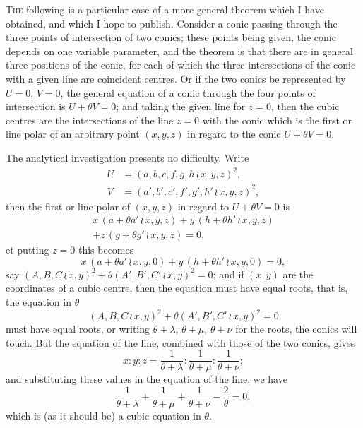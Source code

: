 \documentclass[11pt,a4paper]{book}
\begin{document}
\textsc{The} following is a particular case of a more general theorem which I have obtained, and which I hope to publish. Consider a conic passing through the three points of intersection of two conics; these points being given, the conic depends on one variable parameter, and the theorem is that there are in general three positions of the conic, for each of which the three intersections of the conic with a given line are coincident centres. Or if the two conics be represented by $U=0$, $V=0$, the general equation of a conic through the four points of intersection is $U+\theta V=0$; and taking the given line for $z=0$, then the cubic centres are the intersections of the line $z=0$ with the conic which is the first or line polar of an arbitrary point $(x, y, z)$ in regard to the conic $U+\theta V=0$.

The analytical investigation presents no difficulty. Write
\begin{align*}
U &= (a,b,c,f,g,h\,\wr\,x,y,z)^2, \\
V &= (a',b',c',f',g',h'\,\wr\,x,y,z)^2,
\end{align*}
then the first or line polar of $(x, y, z)$ in regard to $U+\theta V=0$ is
\begin{multline*}
x\,(a+\theta a'\,\wr\,x,y,z) + y\,(h+\theta h'\,\wr\,x,y,z) \\
+ z\,(g+\theta g'\,\wr\,x,y,z) = 0,
\end{multline*}
et putting $z=0$ this becomes
\[
x\,(a+\theta a'\,\wr\,x,y,0) + y\,(h+\theta h'\,\wr\,x,y,0) = 0,
\]
say $(A,B,C\,\wr\,x,y)^2 + \theta(A',B',C'\,\wr\,x,y)^2=0$; and if $(x, y)$ are the coordinates of a cubic centre, then the equation must have equal roots, that is, the equation in $\theta$
\[
(A,B,C\,\wr\,x,y)^2 + \theta(A',B',C'\,\wr\,x,y)^2 = 0
\]
must have equal roots, or writing $\theta + \lambda$, $\theta + \mu$, $\theta + \nu$ for the roots, the conics will touch. But the equation of the line, combined with those of the two conics, gives
\[
x : y : z = \frac{1}{\theta+\lambda} : \frac{1}{\theta+\mu} : \frac{1}{\theta+\nu};
\]
and substituting these values in the equation of the line, we have
\[
\frac{1}{\theta+\lambda} + \frac{1}{\theta+\mu} + \frac{1}{\theta+\nu} - \frac{2}{\theta} = 0,
\]
which is (as it should be) a cubic equation in $\theta$.
\end{document}
